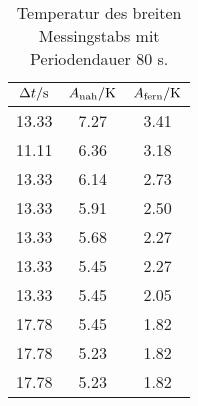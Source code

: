\begin{table}

	\centering

	\caption{Temperatur des breiten Messingstabs mit Periodendauer 80 s.}


	\begin{tabular}{S[table-format=3.2] S[table-format=3.2]S[table-format=3.2]}

		\toprule

		{$\Delta t/\si[per-mode=reciprocal]{\second}$}&{$A_\text{nah}/\si[per-mode=reciprocal]{\kelvin}$}&{$A_\text{fern}/\si[per-mode=reciprocal]{\kelvin}$} \\

		\midrule

		13.33 & 7.27 & 3.41 \\

		11.11 & 6.36 & 3.18 \\

		13.33 & 6.14 & 2.73 \\

		13.33 & 5.91 & 2.50 \\

		13.33 & 5.68 & 2.27 \\

		13.33 & 5.45 & 2.27 \\

		13.33 & 5.45 & 2.05 \\

		17.78 & 5.45 & 1.82 \\

		17.78 & 5.23 & 1.82 \\

		17.78 & 5.23 & 1.82 \\

		\bottomrule

	\end{tabular}

	\label{tab:tab2}

\end{table}

